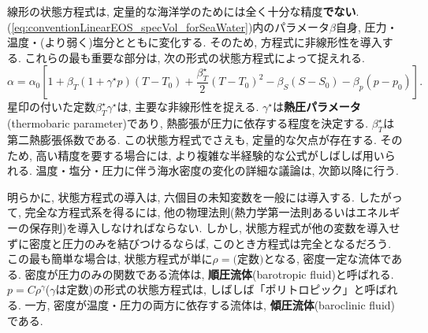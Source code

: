 線形の状態方程式は, 定量的な海洋学のためには全く十分な精度\textbf{でない}. 
(\ref{eq:conventionLinearEOS_specVol_forSeaWater})内のパラメータ$\beta$自身, 
圧力・温度・(より弱く)塩分とともに変化する. 
そのため, 方程式に非線形性を導入する. 
これらの最も重要な部分は, 次の形式の状態方程式によって捉えれる. 
\begin{equation}
 \alpha = \alpha_0 \left[
  1 + \beta_T (1 + \gamma^\star p)(T-T_0)
    + \dfrac{\beta_T^\star}{2}(T-T_0)^2 - \beta_S (S-S_0) - \beta_p(p-p_0)
 \right]. 
\end{equation}
星印の付いた定数$\beta^\star_T \gamma^\star$は, 主要な非線形性を捉える. 
$\gamma^\star$は\textbf{熱圧パラメータ}(thermobaric parameter)であり, 
熱膨張が圧力に依存する程度を決定する. 
$\beta_T^\star$は第二熱膨張係数である. 
この状態方程式でさえも, 定量的な欠点が存在する. 
そのため, 高い精度を要する場合には, より複雑な半経験的な公式がしばしば用いられる. 
温度・塩分・圧力に伴う海水密度の変化の詳細な議論は, 次節以降に行う. 

明らかに, 状態方程式の導入は, 六個目の未知変数を一般には導入する. 
したがって, 完全な方程式系を得るには, 他の物理法則(熱力学第一法則あるいはエネルギーの保存則)を導入しなければならない. 
しかし, 状態方程式が他の変数を導入せずに密度と圧力のみを結びつけるならば, このとき方程式は完全となるだろう. 
この最も簡単な場合は, 状態方程式が単に$\rho=\text{(定数)}$となる, 密度一定な流体である. 
密度が圧力のみの関数である流体は, \textbf{順圧流体}(barotropic fluid)と呼ばれる. 
$p=C\rho^\gamma$($\gamma$は定数)の形式の状態方程式は, しばしば「ポリトロピック」と呼ばれる. 
一方, 密度が温度・圧力の両方に依存する流体は, \textbf{傾圧流体}(baroclinic fluid)である. 